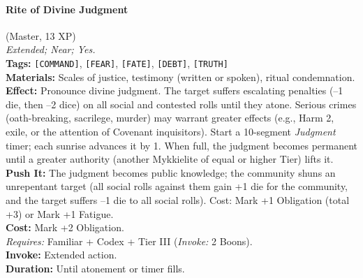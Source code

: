 \paragraph{Rite of Divine Judgment} (Master, 13 XP) \hfill \\
\emph{Extended; Near; Yes.} \\
\textbf{Tags:} \texttt{[COMMAND]}, \texttt{[FEAR]}, \texttt{[FATE]}, \texttt{[DEBT]}, \texttt{[TRUTH]} \\
\textbf{Materials:} Scales of justice, testimony (written or spoken), ritual condemnation. \\
\textbf{Effect:} Pronounce divine judgment. The target suffers escalating penalties (--1 die, then --2 dice) on all social and contested rolls until they atone. Serious crimes (oath-breaking, sacrilege, murder) may warrant greater effects (e.g., Harm 2, exile, or the attention of Covenant inquisitors). Start a 10-segment \textit{Judgment} timer; each sunrise advances it by 1. When full, the judgment becomes permanent until a greater authority (another Mykkielite of equal or higher Tier) lifts it. \\
\textbf{Push It:} The judgment becomes public knowledge; the community shuns an unrepentant target (all social rolls against them gain +1 die for the community, and the target suffers --1 die to all social rolls). Cost: Mark +1 Obligation (total +3) or Mark +1 Fatigue. \\
\textbf{Cost:} Mark +2 Obligation. \\
\textit{Requires:} Familiar + Codex + Tier III (\textit{Invoke:} 2 Boons). \\
\textbf{Invoke:} Extended action. \\
\textbf{Duration:} Until atonement or timer fills.

